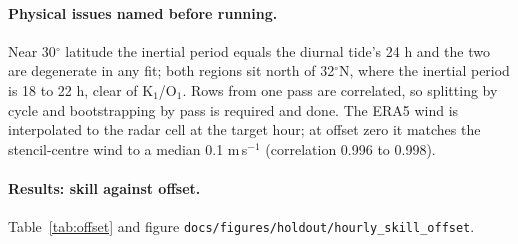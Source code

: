 \documentclass[11pt]{article}
\newcommand{\R}{R^2}
\newcommand{\code}[1]{\texttt{#1}}
\begin{document}
\paragraph{Physical issues named before running.} Near 30$^\circ$ latitude the inertial period equals the diurnal tide's 24 h and the two are degenerate in any fit; both regions sit north of 32$^\circ$N, where the inertial period is 18 to 22 h, clear of K$_1$/O$_1$. Rows from one pass are correlated, so splitting by cycle and bootstrapping by pass is required and done. The ERA5 wind is interpolated to the radar cell at the target hour; at offset zero it matches the stencil-centre wind to a median 0.1 m\,s$^{-1}$ (correlation 0.996 to 0.998).

\paragraph{Results: skill against offset.} Table~\ref{tab:offset} and figure \code{docs/figures/holdout/hourly\_skill\_offset}.

\begin{table}[h]\centering\small
\caption{Hourly experiment, detided target, cycles 017--058, $\R$ $u$ / $v$ by offset from the pass. The two wind models are the mean prediction of seeds 42, 43 and 44 (single-seed values spread $\pm0.005$ around it; \code{experiments/holdout/hourly\_results.md} lists them); the other rows are deterministic or one seed.}
\label{tab:offset}
\end{table}
\end{document}
